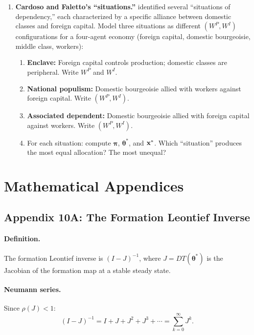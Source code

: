 \documentclass[../structural_economics_book.tex]{subfiles}
\begin{document}
\begin{enumerate}[label=\textbf{10.\arabic*}, leftmargin=3em]
\item \textbf{Cardoso and Faletto's ``situations.''} \citet{cardoso1969dependencia} identified several ``situations of dependency,'' each characterized by a specific alliance between domestic classes and foreign capital. Model three situations as different $(W^P, W^I)$ configurations for a four-agent economy (foreign capital, domestic bourgeoisie, middle class, workers):
\begin{enumerate}
\item \textbf{Enclave:} Foreign capital controls production; domestic classes are peripheral. Write $W^P$ and $W^I$.
\item \textbf{National populism:} Domestic bourgeoisie allied with workers against foreign capital. Write $(W^P, W^I)$.
\item \textbf{Associated dependent:} Domestic bourgeoisie allied with foreign capital against workers. Write $(W^P, W^I)$.
\item For each situation: compute $\boldsymbol{\pi}$, $\boldsymbol{\theta}^*$, and $\mathbf{x}^*$. Which ``situation'' produces the most equal allocation? The most unequal?
\end{enumerate}
\end{enumerate}


\newpage
\section*{Mathematical Appendices}


\subsection*{Appendix 10A: The Formation Leontief Inverse}
\label{ch10:app:leontief}

\paragraph{Definition.} The formation Leontief inverse is $(I - J)^{-1}$, where $J = DT(\boldsymbol{\theta}^*)$ is the Jacobian of the formation map at a stable steady state.

\paragraph{Neumann series.} Since $\rho(J) < 1$:
\begin{equation}
(I - J)^{-1} = I + J + J^2 + J^3 + \cdots = \sum_{k=0}^{\infty} J^k.
\end{equation}
\end{document}
